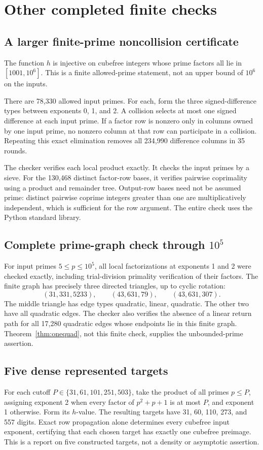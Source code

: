 \documentclass[11pt]{article}
\begin{document}
\section{Other completed finite checks}
\subsection*{A larger finite-prime noncollision certificate}
The function $h$ is injective on cubefree integers whose prime factors all lie in $[1001,10^6]$. This is a finite allowed-prime statement, not an upper bound of $10^6$ on the inputs.

There are 78,330 allowed input primes. For each, form the three signed-difference types between exponents 0, 1, and 2. A collision selects at most one signed difference at each input prime. If a factor row is nonzero only in columns owned by one input prime, no nonzero column at that row can participate in a collision. Repeating this exact elimination removes all 234,990 difference columns in 35 rounds.

The checker verifies each local product exactly. It checks the input primes by a sieve. For the 130,468 distinct factor-row bases, it verifies pairwise coprimality using a product and remainder tree. Output-row bases need not be assumed prime: distinct pairwise coprime integers greater than one are multiplicatively independent, which is sufficient for the row argument. The entire check uses the Python standard library.

\subsection*{Complete prime-graph check through $10^5$}
For input primes $5\le p\le10^5$, all local factorizations at exponents 1 and 2 were checked exactly, including trial-division primality verification of their factors. The finite graph has precisely three directed triangles, up to cyclic rotation:
\[
 (31,331,5233),\qquad(43,631,79),\qquad(43,631,307).
\]
The middle triangle has edge types quadratic, linear, quadratic. The other two have all quadratic edges. The checker also verifies the absence of a linear return path for all 17,280 quadratic edges whose endpoints lie in this finite graph. Theorem~\ref{thm:onequad}, not this finite check, supplies the unbounded-prime assertion.

\subsection*{Five dense represented targets}
For each cutoff $P\in\{31,61,101,251,503\}$, take the product of all primes $p\le P$, assigning exponent 2 when every factor of $p^2+p+1$ is at most $P$, and exponent 1 otherwise. Form its $h$-value. The resulting targets have 31, 60, 110, 273, and 557 digits. Exact row propagation alone determines every cubefree input exponent, certifying that each chosen target has exactly one cubefree preimage. This is a report on five constructed targets, not a density or asymptotic assertion.
\end{document}
